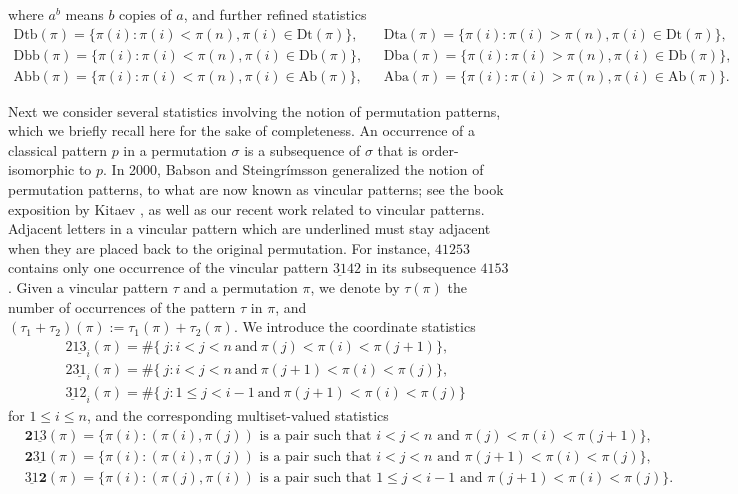 \documentclass[12pt]{amsart}
\numberwithin{equation}{section}
\theoremstyle{plain}
\theoremstyle{definition}
\def\Db{\mathrm{Db}}
\def\Ab{\mathrm{Ab}}
\def\Dt{\mathrm{Dt}}
\def\Dtb{\mathrm{Dtb}}
\def\Dta{\mathrm{Dta}}
\def\Dbb{\mathrm{Dbb}}
\def\Dba{\mathrm{Dba}}
\def\Abb{\mathrm{Abb}}
\def\Aba{\mathrm{Aba}}
\def\pprs{\mathrm{2\underline{13}}}
\def\ppwrs{\mathrm{2\underline{31}}}
\def\pp31-2{\mathrm{\underline{31}2}}
\def\rightascent{{\mathbf{2}\underline{13}}}
\def\leftdescent{\mathrm{\underline{31}}\mathbf{2}}
\def\rightdescent{\mathrm{\mathbf{2}\underline{31}}}
\begin{document}
where $a^b$ means $b$ copies of $a$, and further refined statistics
\begin{align*}
  \Dtb(\pi)=\{\pi(i) : \pi(i) <\pi(n), \pi(i) \in \Dt(\pi)\}, &\,\,\,\, \Dta(\pi)=\{\pi(i) : \pi(i) >\pi(n), \pi(i) \in \Dt(\pi)\}, \\[3pt]
  \Dbb(\pi)=\{\pi(i) : \pi(i) <\pi(n), \pi(i) \in \Db(\pi)\}, &\,\,\,\, \Dba(\pi)=\{\pi(i) : \pi(i) >\pi(n), \pi(i) \in \Db(\pi)\}, \\[3pt]
  \Abb(\pi)=\{\pi(i) : \pi(i) <\pi(n), \pi(i) \in \Ab(\pi)\}, & \,\,\,\,\Aba(\pi)=\{\pi(i) : \pi(i) >\pi(n), \pi(i) \in \Ab(\pi)\}.
\end{align*}







Next we consider several statistics involving the notion of permutation patterns, which we briefly recall here for the sake of completeness. An occurrence of a classical pattern $p$ in a permutation $\sigma$ is a subsequence of $\sigma$ that is order-isomorphic to $p$. In 2000, Babson and Steingr\'{i}msson \cite{BS} generalized the notion of permutation patterns, to what are now known as vincular patterns; see the book exposition by Kitaev \cite{Kit}, as well as our recent work \cite{ChenFu} related to vincular patterns. Adjacent letters in a vincular pattern which are underlined must stay adjacent when they are placed back to the original permutation. For instance, $41253$ contains only one occurrence of the vincular pattern $\underline{31}42$ in its subsequence $4153$. Given a vincular pattern $\tau$ and a permutation $\pi$, we denote by $\tau(\pi)$ the number of occurrences of the pattern $\tau$ in $\pi$, and $(\tau_1+\tau_2)(\pi):=\tau_1(\pi)+\tau_2(\pi)$. We introduce the coordinate statistics
\begin{eqnarray*}

& \pprs_i (\pi) =  \# \{ ~j : i <j <n  ~\text{and}~  \pi(j) < \pi(i) < \pi(j+1)  \},  \\[3pt]
&\ppwrs_i (\pi) =  \# \{ ~j : i <j <n  ~\text{and}~  \pi(j+1) < \pi(i) < \pi(j)  \},  \\[3pt]
&\pp31-2_i (\pi) =  \# \{ ~j : 1  \leq j <i-1  ~\text{and}~  \pi(j+1) < \pi(i) < \pi(j)  \}
\end{eqnarray*}
for $1\le i\le n$, and the corresponding multiset-valued statistics
\begin{eqnarray*}

  &\rightascent(\pi) = \{\pi(i) : (\pi(i), \pi(j)) \text{ is a pair such that } i<j<n \text{ and } \pi(j) < \pi(i) < \pi(j+1) \}, \\[4pt]
   & \rightdescent(\pi) = \{\pi(i) : (\pi(i), \pi(j)) \text{ is a pair such that } i<j<n \text{ and } \pi(j+1) < \pi(i) < \pi(j) \}, \\[4pt]
  & \leftdescent(\pi) = \{\pi(i) : (\pi(j), \pi(i)) \text{ is a pair such that } 1 \leq j <i-1 \text{ and } \pi(j+1) < \pi(i) < \pi(j) \}.
\end{eqnarray*}
\end{document}
